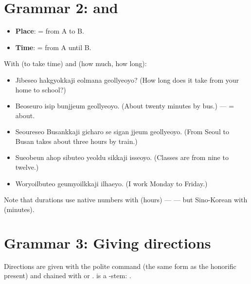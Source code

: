 \section{Grammar 2:  and }

\begin{itemize}
  \item \textbf{Place}:  = from A to B.
  \item \textbf{Time}:  = from A until B.
\end{itemize}

\begin{example}
With  (to take time) and  (how much, how long):
\begin{itemize}
  \item {} Jibeseo hakgyokkaji eolmana geollyeoyo? (How
        long does it take from your home to school?)
  \item {} Beoseuro isip bunjjeum geollyeoyo. (About twenty
        minutes by bus.) ---  = about.
  \item {} Seoureseo Busankkaji gicharo se
        sigan jjeum geollyeoyo. (From Seoul to Busan takes about three hours by train.)
  \item {} Sueobeun ahop sibuteo yeoldu sikkaji
        isseoyo. (Classes are from nine to twelve.)
  \item {} Woryoilbuteo geumyoilkkaji ilhaeyo. (I work
        Monday to Friday.)
\end{itemize}
Note that durations use native numbers with  (hours) ---  --- but
Sino-Korean with  (minutes).
\end{example}

\section{Grammar 3: Giving directions}

Directions are given with the polite command  (the same form as the
honorific present) and chained with  or .  is a
-stem: .


